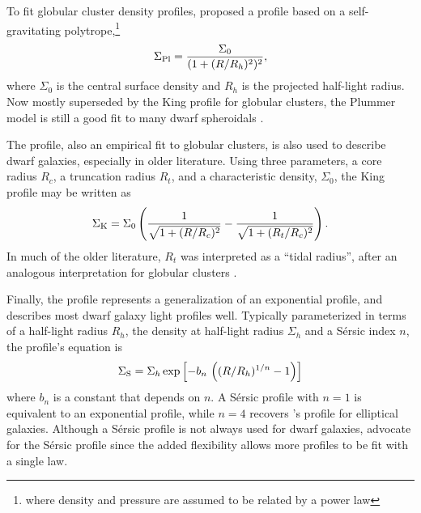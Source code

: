 To fit globular cluster density profiles, \citet{plummer1911} proposed a
profile based on a self-gravitating polytrope,\footnote{where density
  and pressure are assumed to be related by a power law}
\begin{equation}{
\Sigma_{\rm Pl} = \frac{\Sigma_0}{(1 + (R/R_h)^2)^2},
}\end{equation} where \(\Sigma_0\) is the central surface density and
\(R_h\) is the projected half-light radius. Now mostly superseded by the
King profile for globular clusters, the Plummer model is still a good
fit to many dwarf spheroidals \citep[e.g.,][]{moskowitz+walker2020}.

The \citet{king1962} profile, also an empirical fit to globular
clusters, is also used to describe dwarf galaxies, especially in older
literature. Using three parameters, a core radius \(R_c\), a truncation
radius \(R_t\), and a characteristic density, \(\Sigma_0\), the King
profile may be written as \begin{equation}{
\Sigma_{\rm K} = \Sigma_0\left(\frac{1}{\sqrt{1 + (R/R_c)^2}} - \frac{1}{\sqrt{1+(R_t/R_c)^2}}\right).
}\end{equation} In much of the older literature, \(R_t\) was interpreted
as a ``tidal radius'', after an analogous interpretation for globular
clusters \citep[e.g.,][]{hodge1961, IH1995}.

Finally, the \citet{sersic1963} profile represents a generalization of
an exponential profile, and describes most dwarf galaxy light profiles
well. Typically parameterized in terms of a half-light radius \(R_h\),
the density at half-light radius \(\Sigma_h\) and a Sérsic index \(n\),
the profile's equation is \begin{equation}{
\Sigma_{\rm S} = \Sigma_h \exp\left[-b_n \,  \left((R/R_h)^{1/n} - 1\right)\right]
}\end{equation} where \(b_n\) is a constant that depends on \(n\). A
Sérsic profile with \(n=1\) is equivalent to an exponential profile,
while \(n=4\) recovers \citet{devaucouleurs1948}'s profile for
elliptical galaxies. Although a Sérsic profile is not always used for
dwarf galaxies, \citet{munoz+2018} advocate for the Sérsic profile since
the added flexibility allows more profiles to be fit with a single law.

